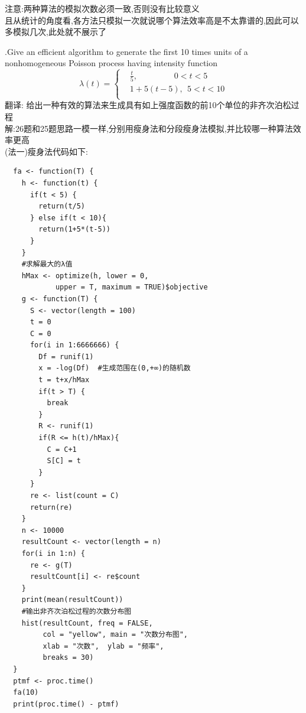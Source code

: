 \documentclass{book}
\begin{document}
\noindent
注意:两种算法的模拟次数必须一致,否则没有比较意义 \\
且从统计的角度看,各方法只模拟一次就说哪个算法效率高是不太靠谱的,因此可以多模拟几次,此处就不展示了

.Give an efficient algorithm to generate the first 10 times units of a nonhomogeneous Poisson process having intensity function \\
\begin{equation}
  \lambda(t) =\left\{
  \begin{aligned}
     & \frac{t}{5}, \ \ \ \ \ \ \ \ \ \ \ \ \ \ \ \ \ \ \ \ 0 < t < 5 \\
     & 1+5(t-5), \ \ 5 < t < 10                                       \\
  \end{aligned}
  \right.
\end{equation}
翻译:
给出一种有效的算法来生成具有如上强度函数的前10个单位的非齐次泊松过程 \\
\noindent
解:26题和25题思路一模一样,分别用瘦身法和分段瘦身法模拟,并比较哪一种算法效率更高 \\
(法一)瘦身法代码如下:
\lstset{language = R}
\begin{lstlisting}
  fa <- function(T) {
    h <- function(t) {
      if(t < 5) {
        return(t/5)
      } else if(t < 10){
        return(1+5*(t-5))
      } 
    }
    #求解最大的λ值
    hMax <- optimize(h, lower = 0,
            upper = T, maximum = TRUE)$objective
    g <- function(T) {
      S <- vector(length = 100)
      t = 0
      C = 0
      for(i in 1:6666666) {
        Df = runif(1)
        x = -log(Df)  #生成范围在(0,+∞)的随机数
        t = t+x/hMax 
        if(t > T) {
          break
        } 
        R <- runif(1)
        if(R <= h(t)/hMax){
          C = C+1
          S[C] = t
        }      
      } 
      re <- list(count = C)
      return(re)
    }
    n <- 10000
    resultCount <- vector(length = n)
    for(i in 1:n) {
      re <- g(T)
      resultCount[i] <- re$count 
    }
    print(mean(resultCount))
    #输出非齐次泊松过程的次数分布图
    hist(resultCount, freq = FALSE,
         col = "yellow", main = "次数分布图",
         xlab = "次数",  ylab = "频率",
         breaks = 30)
  }
  ptmf <- proc.time()
  fa(10)
  print(proc.time() - ptmf)
\end{lstlisting}
\end{document}
